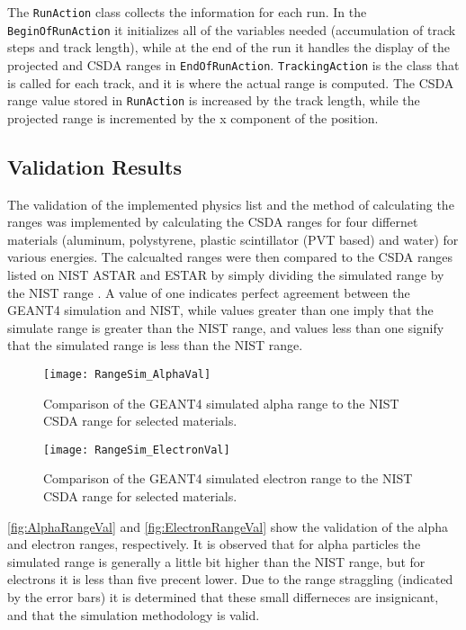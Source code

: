 \documentclass[draftcls,onecolumn]{IEEEtran}
\begin{document}
The \verb+RunAction+ class collects the information for each run. 
In the \verb+BeginOfRunAction+ it initializes all of the variables needed (accumulation of track steps and track length), while at the end of the run it handles the display of the projected and CSDA ranges in \verb+EndOfRunAction+.
\verb+TrackingAction+ is the class that is called for each track, and it is where the actual range is computed.
The CSDA range value stored in \verb+RunAction+ is increased by the track length, while the projected range is incremented by the x component of the position.


\subsection{Validation Results}
\label{sec:ValResults}
The validation of the implemented physics list and the method of calculating the ranges was implemented by calculating the CSDA ranges for four differnet materials (aluminum, polystyrene, plastic scintillator (PVT based) and water) for various energies.
The calcualted ranges were then compared to the CSDA ranges listed on  NIST ASTAR and ESTAR by simply dividing the simulated range by the NIST range \cite{berger_estar_2005}.
A value of one indicates perfect agreement between the GEANT4 simulation and NIST, while values greater than one imply that the simulate range is greater than the NIST range, and values less than one signify that the simulated range is less than the NIST range.
\begin{figure}
	\texttt{[image: RangeSim\_AlphaVal]}
  \caption[Alpha Range Verication]{Comparison of the GEANT4 simulated alpha range to the NIST CSDA range for selected materials.}
  \label{fig:AlphaRangeVal}
\end{figure}
\begin{figure}
  \texttt{[image: RangeSim\_ElectronVal]}
  \caption[Electron Range Verification]{Comparison of the GEANT4 simulated electron range to the NIST CSDA range for selected materials.}
  \label{fig:ElectronRangeVal}
\end{figure}
\autoref{fig:AlphaRangeVal} and \autoref{fig:ElectronRangeVal} show the validation of the alpha and electron ranges, respectively.
It is observed that for alpha particles the simulated range is generally a little bit higher than the NIST range, but for electrons it is less than five precent lower.
Due to the range straggling (indicated by the error bars) it is determined that these small differneces are insignicant, and that the simulation methodology is valid.
\end{document}
